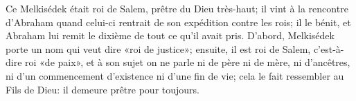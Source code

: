Ce Melkisédek était roi de Salem, prêtre du Dieu très-haut;
	il vint à la rencontre d’Abraham
		quand celui-ci rentrait de son expédition contre les rois;
	il le bénit, et Abraham lui remit le dixième de tout ce qu’il avait pris.
D’abord, Melkisédek porte un nom qui veut dire «roi de justice»;
	ensuite, il est roi de Salem, c’est-à-dire roi «de paix»,
	et à son sujet on ne parle ni de père ni de mère, ni d’ancêtres,
	ni d’un commencement d’existence ni d’une fin de vie;
	cela le fait ressembler au Fils de Dieu: il demeure prêtre pour toujours.
